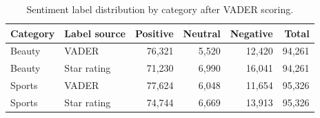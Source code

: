\begin{table}[h]
\centering
\caption{Sentiment label distribution by category after VADER scoring.}
\label{tab:sentiment_summary}
\begin{tabular}{llrrrr}
\toprule
Category & Label source & Positive & Neutral & Negative & Total \\
\midrule
Beauty & VADER & 76,321 & 5,520 & 12,420 & 94,261 \\
Beauty & Star rating & 71,230 & 6,990 & 16,041 & 94,261 \\
Sports & VADER & 77,624 & 6,048 & 11,654 & 95,326 \\
Sports & Star rating & 74,744 & 6,669 & 13,913 & 95,326 \\
\bottomrule
\end{tabular}
\end{table}